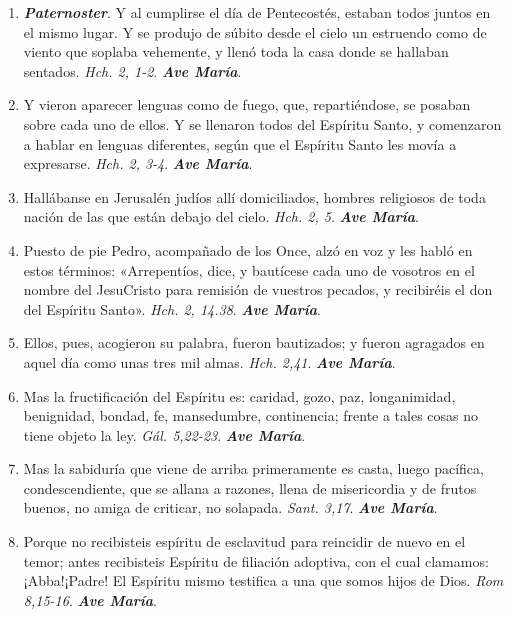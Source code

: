 \documentclass[../../devocionario.tex]{subfiles}
\begin{document}
    \begin{enumerate}
    
        \item \textbf{\textit{Paternoster}}. Y al cumplirse el día de Pentecostés, estaban todos juntos en el mismo lugar. 
            Y se produjo de súbito desde el cielo un estruendo como de viento que soplaba vehemente, 
            y llenó toda la casa donde se hallaban sentados. \textit{Hch. 2, 1-2}. \textbf{\textit{Ave María}}.

        \item Y vieron aparecer lenguas como de fuego, que, repartiéndose, se posaban sobre cada uno de ellos. 
            Y se llenaron todos del Espíritu Santo, y comenzaron a hablar en lenguas diferentes, 
            según que el Espíritu Santo les movía a expresarse. \textit{Hch. 2, 3-4}. \textbf{\textit{Ave María}}.

        \item Hallábanse en Jerusalén judíos allí domiciliados, hombres religiosos de toda nación de 
            las que están debajo del cielo. \textit{Hch. 2, 5}. \textbf{\textit{Ave María}}.

        \item Puesto de pie Pedro, acompañado de los Once, alzó en voz y les habló en estos términos: 
            «Arrepentíos, dice, y bautícese cada uno de vosotros en el nombre del JesuCristo para remisión de vuestros pecados, 
            y recibiréis el don del Espíritu Santo». \textit{Hch. 2, 14.38}. \textbf{\textit{Ave María}}.

        \item Ellos, pues, acogieron su palabra, fueron bautizados; y fueron agragados 
            en aquel día como unas tres mil almas. \textit{Hch. 2,41}. \textbf{\textit{Ave María}}.

        \item Mas la fructificación del Espíritu es: caridad, gozo, paz, longanimidad, benignidad, 
            bondad, fe, mansedumbre, continencia; frente a tales cosas no tiene objeto la ley. \textit{Gál. 5,22-23}. \textbf{\textit{Ave María}}.

        \item Mas la sabiduría que viene de arriba primeramente es casta, luego pacífica, condescendiente, 
            que se allana a razones, llena de misericordia y de frutos buenos, 
            no amiga de criticar, no solapada. \textit{Sant. 3,17}. \textbf{\textit{Ave María}}.

        \item Porque no recibisteis espíritu de esclavitud para reincidir de nuevo en el temor; 
            antes recibisteis Espíritu de filiación adoptiva, con el cual clamamos: ¡Abba!¡Padre! 
            El Espíritu mismo testifica a una que somos hijos de Dios. \textit{Rom 8,15-16}. \textbf{\textit{Ave María}}.


\end{enumerate}
\end{document}
